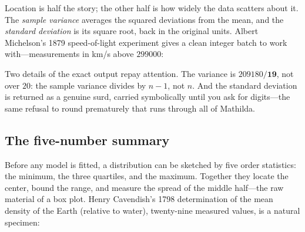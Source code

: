 Location is half the story; the other half is how widely the data scatters about
it. The \emph{sample variance} averages the squared deviations from the mean, and
the \emph{standard deviation} is its square root, back in the original units.
Albert Michelson's 1879 speed-of-light experiment gives a
clean integer batch to work with---measurements in km/s above \(299000\):

\begin{codepairs}
\end{codepairs}

Two details of the exact output repay attention. The variance is
\(209180/\mathbf{19}\), not over \(20\): the sample variance divides by \(n-1\),
not \(n\). And the standard deviation is returned as a genuine surd, carried
symbolically until you ask for digits---the same refusal to round prematurely that
runs through all of Mathilda.



\subsection{The five-number summary}
\label{ssec:stat-fivenum}

Before any model is fitted, a distribution can be sketched by five order
statistics: the minimum, the three quartiles, and the maximum. Together they
locate the center, bound the range, and measure the spread of the middle
half---the raw material of a box plot. Henry Cavendish's 1798 determination of the
mean density of the Earth (relative to water), twenty-nine
measured values, is a natural specimen:

